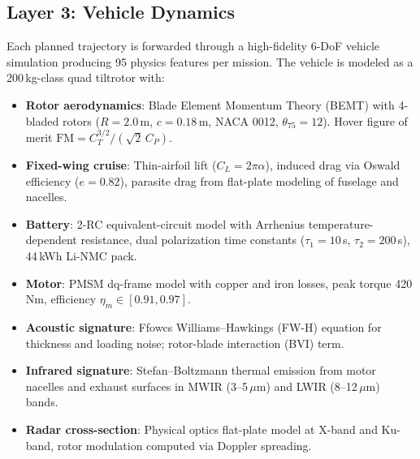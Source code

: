 \documentclass{article}
\begin{document}
\subsection{Layer 3: Vehicle Dynamics}
\label{sec:vehicle}

Each planned trajectory is forwarded through a high-fidelity 6-DoF vehicle
simulation producing 95 physics features per mission. The vehicle is modeled
as a 200\,kg-class quad tiltrotor with:

\begin{itemize}
  \item \textbf{Rotor aerodynamics}: Blade Element Momentum Theory (BEMT)
    with 4-bladed rotors ($R = 2.0$\,m, $c = 0.18$\,m, NACA 0012, $\theta_{75} = 12$\textdegree{}).
    Hover figure of merit $\mathrm{FM} = C_T^{3/2} / (\sqrt{2}\,C_P)$.
  \item \textbf{Fixed-wing cruise}: Thin-airfoil lift ($C_L = 2\pi\alpha$),
    induced drag via Oswald efficiency ($e = 0.82$), parasite drag
    from flat-plate modeling of fuselage and nacelles.
  \item \textbf{Battery}: 2-RC equivalent-circuit model with Arrhenius
    temperature-dependent resistance, dual polarization time constants
    ($\tau_1 = 10$\,s, $\tau_2 = 200$\,s), 44\,kWh Li-NMC pack.
  \item \textbf{Motor}: PMSM dq-frame model with copper and iron losses,
    peak torque 420\,Nm, efficiency $\eta_m \in [0.91, 0.97]$.
  \item \textbf{Acoustic signature}: Ffowcs Williams--Hawkings (FW-H) equation
    for thickness and loading noise; rotor-blade interaction (BVI) term.
  \item \textbf{Infrared signature}: Stefan--Boltzmann thermal emission from
    motor nacelles and exhaust surfaces in MWIR (3--5\,$\mu$m) and LWIR
    (8--12\,$\mu$m) bands.
  \item \textbf{Radar cross-section}: Physical optics flat-plate model at
    X-band and Ku-band, rotor modulation computed via Doppler spreading.
\end{itemize}
\end{document}
